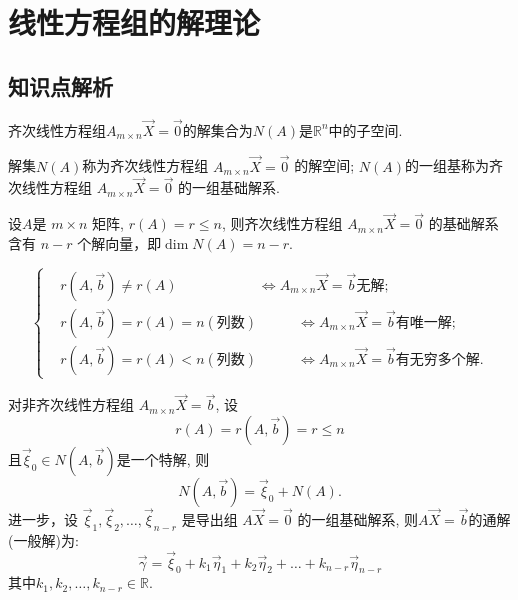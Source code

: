 \chapter{线性方程组的解理论}

\section{知识点解析}

\begin{thm}
齐次线性方程组$A_{m\times n}\vec{X}=\vec{0}$的解集合为$N(A)$是$\mathbb{R}^n$中的子空间.
\end{thm}

\begin{Def}
解集$N(A)$称为齐次线性方程组 $A_{m\times n}\vec{X}=\vec{0}$ 的解空间;
           $N(A)$的一组基称为齐次线性方程组 $A_{m\times n}\vec{X}=\vec{0}$ 的一组基础解系.
\end{Def}

\begin{thm}
设$A$是 $m\times n$ 矩阵, $r(A) = r \leq n$, 则齐次线性方程组 $A_{m\times n}\vec{X}=\vec{0}$ 的基础解系含有 $n - r$ 个解向量，即$\dim N(A)= n - r$.
\end{thm}

\begin{thm}
\begin{displaymath}\left\{\begin{aligned}
&r(A,\vec{b})\not=r(A) \ \ \ \ \ \ \ \ \ \ \ \ \ \  \ \ \ \ \ \ \ \ \ \ \ \   \Leftrightarrow A_{m\times n}\vec{X}=\vec{b}\mbox{无解};\\
&r(A,\vec{b})=r(A)=n(\mbox{列数}) \ \ \ \ \ \ \ \ \ \ \ \ \ \Leftrightarrow A_{m\times n}\vec{X}=\vec{b}\mbox{有唯一解};\\
&r(A,\vec{b})=r(A)<n(\mbox{列数}) \ \ \ \ \ \ \ \ \ \ \ \ \ \Leftrightarrow A_{m\times n}\vec{X}=\vec{b}\mbox{有无穷多个解}.
\end{aligned}\right.\end{displaymath}

\end{thm}

\begin{thm}
对非齐次线性方程组 $A_{m\times n}\vec{X}=\vec{b}$,  设 $$r(A)=r(A,\vec{b})=r \leq n$$
且$\vec{\xi}_0\in  N(A, \vec{b})$是一个特解, 则
$$N(A,\vec{b})=\vec{\xi}_0+N(A).$$
进一步，设 $\vec{\xi}_1, \vec{\xi}_2,\dots,\vec{\xi}_{n-r}$ 是导出组 $A\vec{X}=\vec{0}$ 的一组基础解系, 则$A\vec{X}=\vec{b}$的通解(一般解)为:
$$\vec{\gamma}=\vec{\xi}_0+k_1\vec{\eta}_1+k_2\vec{\eta}_2+\dots+k_{n-r}\vec{\eta}_{n-r}$$
其中$k_1, k_2,\dots,k_{n-r}\in\mathbb{R}.$
\end{thm}

